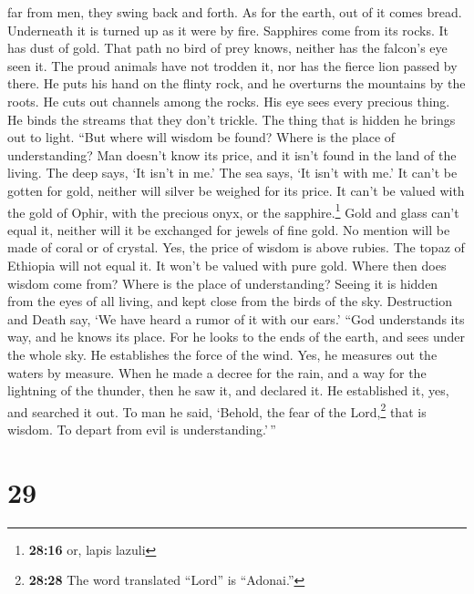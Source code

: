 far from men, they swing back and forth.  As for the
earth, out of it comes bread. Underneath it is turned up as it were by
fire.  Sapphires come from its rocks. It has dust of gold.
 That path no bird of prey knows, neither has the falcon's
eye seen it.  The proud animals have not trodden it, nor
has the fierce lion passed by there.  He puts his hand on
the flinty rock, and he overturns the mountains by the roots.
 He cuts out channels among the rocks. His eye sees every
precious thing.  He binds the streams that they don't
trickle. The thing that is hidden he brings out to light.
 ``But where will wisdom be found? Where is the place of
understanding?  Man doesn't know its price, and it isn't
found in the land of the living.  The deep says, `It
isn't in me.' The sea says, `It isn't with me.'  It can't
be gotten for gold, neither will silver be weighed for its price.
 It can't be valued with the gold of Ophir, with the
precious onyx, or the sapphire.\footnote{\textbf{28:16} or, lapis lazuli}
 Gold and glass can't equal it, neither will it be
exchanged for jewels of fine gold.  No mention will be
made of coral or of crystal. Yes, the price of wisdom is above rubies.
 The topaz of Ethiopia will not equal it. It won't be
valued with pure gold.  Where then does wisdom come from?
Where is the place of understanding?  Seeing it is hidden
from the eyes of all living, and kept close from the birds of the sky.
 Destruction and Death say, `We have heard a rumor of it
with our ears.'  ``God understands its way, and he knows
its place.  For he looks to the ends of the earth, and
sees under the whole sky.  He establishes the force of
the wind. Yes, he measures out the waters by measure. 
When he made a decree for the rain, and a way for the lightning of the
thunder,  then he saw it, and declared it. He established
it, yes, and searched it out.  To man he said, `Behold,
the fear of the Lord,\footnote{\textbf{28:28} The word translated
  ``Lord'' is ``Adonai.''} that is wisdom. To depart from evil is
understanding.'\,''

\hypertarget{section-21}{%
\section{29}\label{section-21}}

